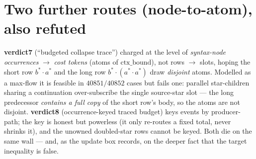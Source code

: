 \documentclass{article}
\newcommand{\ctxb}{\mathrm{ctx\_bound}}
\newcommand{\seq}{\cdot}
\begin{document}
\section{Two further routes (node-to-atom), also refuted}
\textbf{verdict7} (``budgeted collapse trace'') charged at the level of \emph{syntax-node occurrences} $\to$
\emph{cost tokens} (atoms of $\ctxb$), not rows $\to$ slots, hoping the short row $b^{*}\seq a^{*}$ and the long
row $b^{*}\seq(a^{*}\seq a^{*})$ draw \emph{disjoint} atoms. Modelled as a max-flow it is feasible in $40851/40852$
cases but fails one: parallel star-children sharing a continuation over-subscribe the single source-star slot ---
the long predecessor \emph{contains a full copy} of the short row's body, so the atoms are not disjoint.
\textbf{verdict8} (occurrence-keyed traced budget) keys events by producer-path; the key is honest but powerless
(it only re-routes a fixed total, never shrinks it), and the unowned doubled-star rows cannot be keyed. Both die on
the same wall --- and, as the update box records, on the deeper fact that the target inequality is false.
\end{document}
